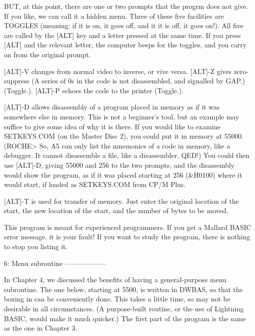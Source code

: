 BUT,  at  this point, there are one or two prompts that the  progrm  does  not 
give.  If  you  like,  we  can call it a hidden  menu.  Three  of  these  five 
facilities  are TOGGLES (meaning: if it is on, it goes off, and it it is  off, 
it goes on!). All five are called by the [ALT] key and a letter pressed at the 
same time. If you press [ALT] and the relevant letter, the computer beeps  for 
the toggles, and you carry on from the original prompt.

[ALT]-V  changes  from normal video to inverse, or vive versa.  [ALT]-Z  gives 
zero-suppress  (A series of 0s in the code is not disassembled, and  signalled 
by GAP.) (Toggle.). [ALT]-P echoes the code to the printer (Toggle.).

[ALT]-D  allows  disassembly  of  a program placed in  memory  as  if  it  was 
somewhere  else in memory. This is not a beginner's tool, but an  example  may 
suffice  to  give some idea of why it is there. If you would like  to  examine 
SETKEYS.COM  (on  the  Master Disc 2), you could put it in  memory  at  55000. 
(ROCHE>  So,  A5  can  only list the mnemonics of a code  in  memory,  like  a 
debugger.  It cannot disassemble a file, like a disassembler. QED!) You  could 
then use [ALT]-D, giving 55000 and 256 to the two prompts, and the disassembly 
would show the program, as if it was placed starting at 256 (&H0100) where  it 
would start, if loaded as SETKEYS.COM from CP/M Plus.

[ALT]-T  is used for transfer of memory. Just enter the original  location  of 
the start, the new location of the start, and the number of bytes to be moved.

This program is meant for experienced programmers. If you get a Mallard  BASIC 
error  message, it is your fault! If you want to study the program,  there  is 
nothing to stop you listing it.


6: Menu subroutine
------------------

In  Chapter  4,  we discussed the benefits of having  a  general-purpose  menu 
subroutine. The one below, starting at 5500, is written in DWBAS, so that  the 
boxing  in can be conveniently done. This takes a little time, so may  not  be 
desirable  in  all  circumstances. (A purpose-built routine,  or  the  use  of 
Lightning BASIC, would make it much quicker.) The first part of the program is 
the same as the one in Chapter 3.

